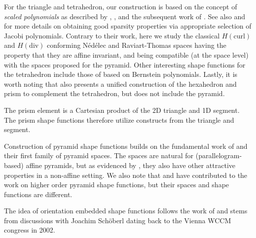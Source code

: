 For the triangle and tetrahedron, our construction is based on the concept of \textit{scaled polynomials} as described by \citet{karniadakisbook}, \citet{Schoeberl_Zaglmayr_05}, \citet{SabineThesis} and the subsequent work of \citet{Beuchler_Pillwein_Schoeberl_Zaglmayr_12}.
See also \citet{Beuchler_Schoeberl_06, Beuchler_Pillwein_07, Beuchler_Pillwein_Zaglmayr_12} and \citet{Beuchler_Pillwein_Zaglmayr_13} for more details on obtaining good sparsity properties via appropriate selection of Jacobi polynomials.
Contrary to their work, here we study the classical $H(\text{curl})$ and $H(\text{div})$ conforming N\'{e}d\'{e}lec and Raviart-Thomas spaces having the property that they are affine invariant, and being compatible (at the space level) with the spaces proposed for the pyramid.
Other interesting shape functions for the tetrahedron include those of \citet{AinsworthBezier} based on Bernstein polynomials. Lastly, it is worth noting that \citet{SabineThesis} also presents a unified construction of the hexahedron and prism to complement the tetrahedron, but does not include the pyramid.

The prism element is a Cartesian product of the 2D triangle and 1D segment.
The prism shape functions therefore utilize constructs from the triangle and segment.

Construction of pyramid shape functions builds on the fundamental work of \citet{Nigam_Phillips_11} and their first family of pyramid spaces.
The spaces are natural for (parallelogram-based) affine pyramids, but as evidenced by \citet{Bergot_Durufle_14}, they also have other attractive properties in a non-affine setting.
We also note that \citet{Bergot_Gary_Durufle_10} and \citet{Bergot_Durufle_14} have contributed to the work on higher order pyramid shape functions, but their spaces and shape functions are different.

The idea of orientation embedded shape functions follows the work of \citet{GattoDemkowicz10} and stems from discussions with Joachim Sch\"oberl dating back to the Vienna WCCM congress in 2002.

